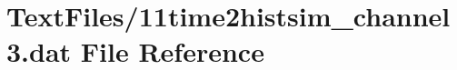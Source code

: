\hypertarget{11time2histsim__channel3_8dat}{}\section{Text\+Files/11time2histsim\+\_\+channel3.dat File Reference}
\label{11time2histsim__channel3_8dat}
